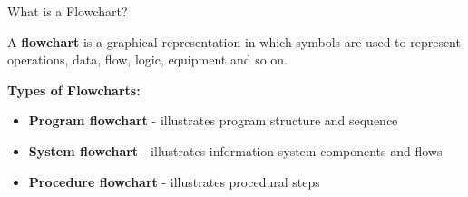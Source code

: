 \documentclass[aspectratio=169]{beamer}
\begin{document}
\begin{frame}{What is a Flowchart?}
    \begin{definition}
        A \textbf{flowchart} is a graphical representation in which symbols are used to represent operations, data, flow, logic, equipment and so on.
    \end{definition}
    
    \vspace{0.3cm}
    \textbf{Types of Flowcharts:}
    \begin{itemize}
        \item \textbf{Program flowchart} - illustrates program structure and sequence
        \item \textbf{System flowchart} - illustrates information system components and flows
        \item \textbf{Procedure flowchart} - illustrates procedural steps
    \end{itemize}
\end{frame}
\end{document}
